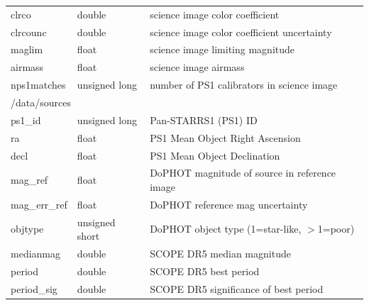 \documentclass[12pt]{article}
\begin{document}
\begin{table}[ht!]
\begin{tabular}{ |p{3.5cm}p{2.5cm}p{9cm}| }
 \hspace{1.0cm}clrco       &   double           &   science image color coefficient \\
 \hspace{1.0cm}clrcounc    &   double           &   science image color coefficient uncertainty \\
 \hspace{1.0cm}maglim      &   float            &   science image limiting magnitude \\
 \hspace{1.0cm}airmass     &   float            &   science image airmass \\
 \hspace{1.0cm}nps1matches &   unsigned long    &   number of PS1 calibrators in science image \\
 \hline
 \multicolumn{3}{|l|}{\hspace{0.5cm}/data/sources} \\
 \hspace{1.0cm}ps1\_id       &   unsigned long   &   Pan-STARRS1 (PS1) ID \\
 \hspace{1.0cm}ra            &   float           &   PS1 Mean Object Right Ascension \\
 \hspace{1.0cm}decl          &   float           &   PS1 Mean Object Declination \\
 \hspace{1.0cm}mag\_ref      &   float           &   DoPHOT magnitude of source in reference image \\
 \hspace{1.0cm}mag\_err\_ref &   float           &   DoPHOT reference mag uncertainty \\
 \hspace{1.0cm}objtype       &   unsigned short  &   DoPHOT object type (1=star-like, $>$1=poor) \\
 \rowcolor{LightGoldenrodYellow}
 \hspace{1.0cm}medianmag     &   double          &   SCOPE DR5 median magnitude \\
 \rowcolor{LightGoldenrodYellow}
 \hspace{1.0cm}period        &   double          &   SCOPE DR5 best period \\
 \rowcolor{LightGoldenrodYellow}
 \hspace{1.0cm}period\_sig   &   double          &   SCOPE DR5 significance of best period \\

\end{tabular}
\end{table}
\end{document}
